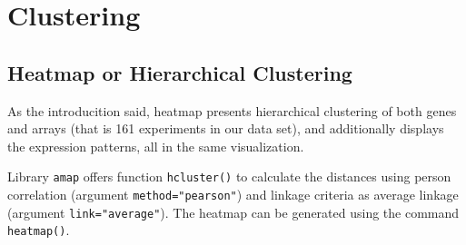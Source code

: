 \documentclass[oneside, a4paper, 11pt]{book}
\begin{document}


\section{Clustering}
\subsection{Heatmap or Hierarchical Clustering}
As the introducition said, heatmap presents hierarchical clustering of both genes and arrays (that is 161 experiments in our data set), and additionally displays the expression patterns, all in the same visualization.

Library \texttt{amap} offers function \texttt{hcluster()} to calculate the distances using person correlation (argument \texttt{method="pearson"}) and linkage criteria as average linkage (argument \texttt{link="average"}). The  heatmap can be generated using the command \texttt{heatmap()}.
\end{document}
